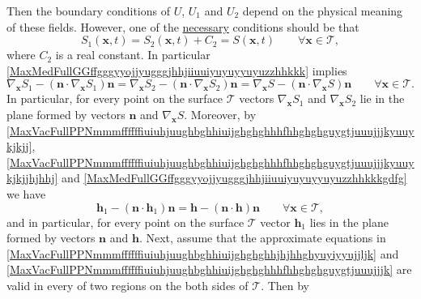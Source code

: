 \documentclass{article}
\theoremstyle{definition}
\theoremstyle{remark}
\renewcommand{\vec}[1]{\mathbf{#1}}
\newcommand{\er}{\eqref}
\newcommand{\er}{\eqref}
\begin{document}
Then the boundary conditions of $U$, $U_1$ and $U_2$ depend on the
physical meaning of these fields. However, one of the
\underline{necessary} conditions should be that
\begin{equation}\label{MaxMedFullGGffgggyyojjyugggjhhjiiuuiyuyuyyuyuzzhhkkk}
S_1(\vec x,t)=S_2(\vec x,t)+C_2=S(\vec x,t)\quad\quad\forall\vec
x\in\mathcal{T},
\end{equation}
where $C_2$ is a real constant. In particular
\er{MaxMedFullGGffgggyyojjyugggjhhjiiuuiyuyuyyuyuzzhhkkk} implies
\begin{equation}\label{MaxMedFullGGffgggyyojjyugggjhhjiiuuiyuyuyyuyuzzhhkkkgdfg}
\nabla_{\vec x} S_1-\left(\vec n\cdot \nabla_{\vec x} S_1\right)\vec
n
=\nabla_{\vec x} S_2-\left(\vec n\cdot \nabla_{\vec x}
S_2\right)\vec n=\nabla_{\vec x} S-\left(\vec n\cdot \nabla_{\vec x}
S\right)\vec n\quad\quad\forall\vec x\in\mathcal{T}.
\end{equation}
In particular, for every point on the surface $\mathcal{T}$ vectors
$\nabla_{\vec x} S_1$ and $\nabla_{\vec x} S_2$ lie in the plane
formed by vectors $\vec n$ and $\nabla_{\vec x} S$. Moreover, by
\er{MaxVacFullPPNmmmffffffiuiuhjuughbghhiuijghghghhhfhhghghguygtjuuujjjkyuuykjkjj},
\er{MaxVacFullPPNmmmffffffiuiuhjuughbghhiuijghghghhhfhhghghguygtjuuujjjkyuuykjkjjhjhhj}
and \er{MaxMedFullGGffgggyyojjyugggjhhjiiuuiyuyuyyuyuzzhhkkkgdfg} we
have
\begin{equation}\label{MaxMedFullGGffgggyyojjyugggjhhjiiuuiyuyuyyuyuzzhhkkkgdfghgghgh}
\vec h_1-\left(\vec n\cdot \vec h_1\right)\vec n=\vec h-\left(\vec
n\cdot \vec h\right)\vec n\quad\quad\forall\vec x\in\mathcal{T},
\end{equation}
and in particular, for every point on the surface $\mathcal{T}$
vector $\vec h_1$ lies in the plane formed by vectors $\vec n$ and
$\vec h$.
Next, assume that the approximate equations in
\er{MaxVacFullPPNmmmffffffiuiuhjuughbghhiuijghghghhjhjhhghyuyiyyujjljk}
and
\er{MaxVacFullPPNmmmffffffiuiuhjuughbghhiuijghghghhhfhhghghguygtjuuujjjk}
are valid in every of two regions on the both sides of
$\mathcal{T}$. Then by
\end{document}
